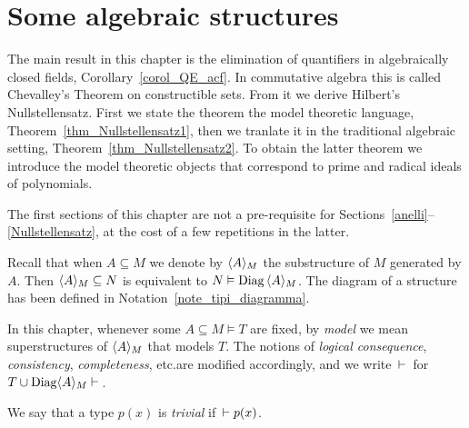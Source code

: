 \chapter{Some algebraic structures}
\label{algebraic}

\def\medrel#1{\parbox[b]{6ex}{\hfil$#1$}}
\def\ceq#1#2#3{\parbox[b]{25ex}{$\displaystyle #1$}\medrel{#2}$\displaystyle #3$}

The main result in this chapter is the elimination of quantifiers in algebraically closed fields, Corollary~\ref{corol_QE_acf}.
In commutative algebra this is called Chevalley's Theorem on constructible sets.
%
From it we derive Hilbert's Nullstellensatz.
First we state the theorem the model theoretic language, Theorem~\ref{thm_Nullstellensatz1}, then we tranlate it in the traditional algebraic setting, Theorem~\ref{thm_Nullstellensatz2}.
%
To obtain the latter theorem we introduce the model theoretic objects that correspond to prime and radical ideals of polynomials.


The first sections of this chapter are not a pre-requisite for Sections~\ref{anelli}\kern1.5pt--\kern1pt\ref{Nullstellensatz}, at the cost of a few repetitions in the latter.

\begin{notation}\label{notation1}
Recall that when $A\subseteq M$ we denote by \emph{$\langle A\rangle_M$\/} the substructure of $M$ generated by $A$.
%
Then $\langle A\rangle_M\subseteq N$ is equivalent to $N\vDash {\rm Diag}\,\langle A\rangle_M$.
%
The diagram of a structure has been defined in Notation~\ref{note_tipi_diagramma}.

In this chapter, whenever some $A\subseteq M\models T$ are fixed, by \textit{model\/} we mean superstructures of $\langle A\rangle_M$ that models $T$.
%
The notions of \textit{logical consequence}, \textit{consistency}, \textit{completeness}, etc.\@ are modified accordingly, and we write $\,\vdash\,$ for $T\cup{\rm Diag}\langle A\rangle_M\vdash\,$.

We say that a type $p(x)$ is \emph{trivial\/} if $\,\vdash p(x)$.
\end{notation}

